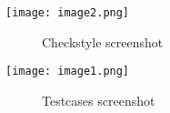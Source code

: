 \documentclass[letterpaper, 11pt]{report}
\begin{document}
\begin{center}
    \texttt{[image: image2.png]} \\
    \begin{figure}[h!]
    \centering
        \caption{Checkstyle screenshot}
        \label{Checkstyle screenshot}
    \end{figure}
\end{center}

\begin{center}
    \texttt{[image: image1.png]} \\
    \begin{figure}[h!]
    \centering
        \caption{Testcases screenshot}
        \label{Testcases screenshot}
    \end{figure}
\end{center}
\pagebreak
\end{document}
